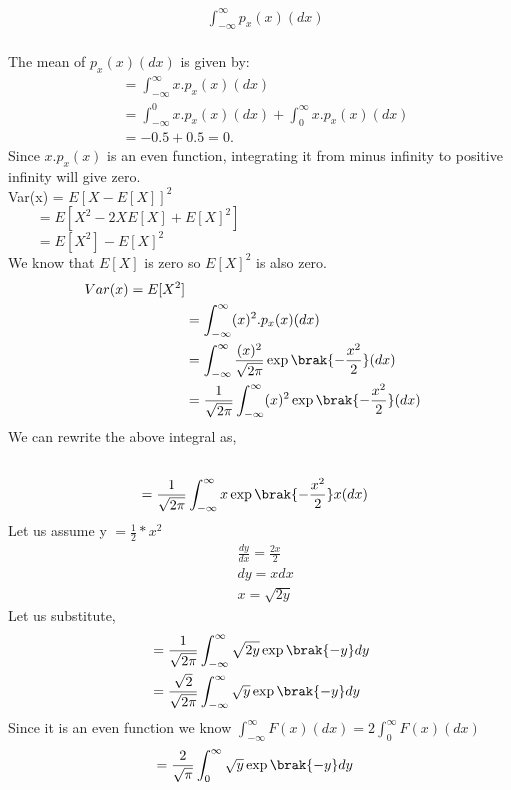 \documentclass[journal,12pt,twocolumn]{IEEEtran}
\begin{document}
\solution
\begin{align*}
\\
&\int_{-\infty}^{\infty}p_{x}(x)(dx)
\end{align*}
\\
The mean of $p_{x}(x)(dx)$ is given by:
\begin{align*}
&= \int_{-\infty}^{\infty}x.p_{x}(x)(dx)
\\
&= \int_{-\infty}^{0}x.p_{x}(x)(dx) +\int_{0}^{\infty}x.p_{x}(x)(dx)
\\
&=-0.5+0.5 = 0.
\end{align*}
Since $x.p_{x}(x)$ is an even function, integrating it from minus infinity to positive infinity will give zero.
\\
Var(x) = $E[X-E[X]]^2$
\\
$~~~~~~~~~=E[X^2-2XE[X]+E[X]^2]$
\\
$~~~~~~~~~=E[X^2]-E[X]^2$
\\
We know that $E[X]$ is zero so $E[X]^2$ is also zero.
\begin{align*}
Var(x) = E[X^2]
\\
& = \int_{-\infty}^{\infty}(x)^2.p_{x}(x)(dx)
\\
& = \int_{-\infty}^{\infty}\frac{(x)^2}{\sqrt{2\pi}}\exp\brak{-\frac{x^2}{2}}(dx)
\\
& = \frac{1}{\sqrt{2\pi}}\int_{-\infty}^{\infty}(x)^2\exp\brak{-\frac{x^2}{2}}(dx)
\end{align*}
We can rewrite the above integral as,
\begin{align*}
\\
& = \frac{1}{\sqrt{2\pi}}\int_{-\infty}^{\infty}x\exp\brak{-\frac{x^2}{2}}x(dx)
\end{align*}
Let us assume  y $ = \frac{1}{2}*x^2$
\begin{align*}
& \frac{dy}{dx} = \frac{2x}{2}
\\
& dy = xdx
\\
& x = \sqrt{2y}
\end{align*}
Let us substitute,
\begin{align*}
& = \frac{1}{\sqrt{2\pi}}\int_{-\infty}^{\infty}\sqrt{2y}\exp\brak{-y}dy
\\
& = \frac{\sqrt{2}}{\sqrt{2\pi}}\int_{-\infty}^{\infty}\sqrt{y}\exp\brak{-y}dy
\end{align*}
Since it is an even function we know $\int_{-\infty}^{\infty}F(x)(dx) = 2\int_{0}^{\infty}F(x)(dx)$
\begin{align*}
& = \frac{2}{\sqrt{\pi}}\int_{0}^{\infty}\sqrt{y}\exp\brak{-y}dy
\end{align*}
\end{document}

